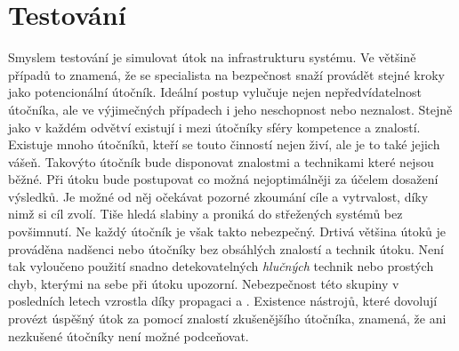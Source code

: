 \section{Testování}\label{sec:testovani}
Smyslem testování je simulovat útok na infrastrukturu systému.
Ve většině případů to znamená, že se specialista na bezpečnost snaží provádět stejné kroky jako potencionální útočník.
Ideální postup vylučuje nejen nepředvídatelnost útočníka, ale ve výjimečných případech i jeho neschopnost nebo neznalost.
Stejně jako v každém odvětví existují i mezi útočníky sféry kompetence a znalostí.
Existuje mnoho útočníků, kteří se touto činností nejen živí, ale je to také jejich vášeň.
Takovýto útočník bude disponovat znalostmi a technikami které nejsou běžné.
Při útoku bude postupovat co možná nejoptimálněji za účelem dosažení výsledků.
Je možné od něj očekávat pozorné zkoumání cíle a vytrvalost, díky nimž si cíl zvolí.
Tiše hledá slabiny a proniká do střežených systémů bez povšimnutí.
Ne každý útočník je však takto nebezpečný.
Drtivá většina útoků je prováděna nadšenci nebo útočníky bez obsáhlých znalostí a technik útoku.
Není tak vyloučeno použití snadno detekovatelných \textit{hlučných} technik nebo prostých chyb, kterými na sebe při útoku upozorní.
Nebezpečnost této skupiny v posledních letech vzrostla díky propagaci \cite{MaaS_ATaT} a \cite{RaaS_microsoft}.
Existence nástrojů, které dovolují provézt úspěšný útok za pomocí znalostí zkušenějšího útočníka, znamená, že ani nezkušené útočníky není možné podceňovat.


